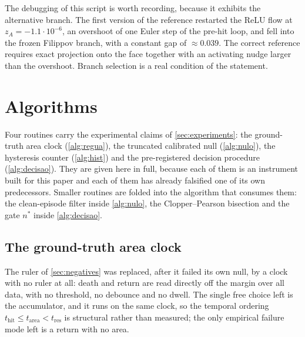 \documentclass[11pt]{article}
\theoremstyle{definition}
\theoremstyle{remark}
\newcommand{\thit}{t_{\mathrm{hit}}}
\begin{document}
The debugging of this script is worth recording, because it exhibits the
alternative branch. The first version of the reference restarted the ReLU flow at
$z_A=-1.1\cdot10^{-6}$, an overshoot of one Euler step of the pre-hit loop, and
fell into the frozen Filippov branch, with a constant gap of $\approx0.039$. The
correct reference requires exact projection onto the face together with an
activating nudge larger than the overshoot. Branch selection is a real condition
of the statement.

\section{Algorithms}\label{app:algorithms}

Four routines carry the experimental claims of \cref{sec:experiments}: the
ground-truth area clock (\cref{alg:regua}), the truncated calibrated null
(\cref{alg:nulo}), the hysteresis counter (\cref{alg:hist}) and the
pre-registered decision procedure (\cref{alg:decisao}). They are given here in
full, because each of them is an instrument built for this paper and each of them
has already falsified one of its own predecessors. Smaller routines are folded
into the algorithm that consumes them: the clean-episode filter inside
\cref{alg:nulo}, the Clopper--Pearson bisection and the gate $n^\ast$ inside
\cref{alg:decisao}.

\subsection{The ground-truth area clock}\label{app:alg1}

The ruler of \cref{sec:negatives} was replaced, after it failed its own null, by
a clock with no ruler at all: death and return are read directly off the margin
over all data, with no threshold, no debounce and no dwell. The single free
choice left is the accumulator, and it runs on the same clock, so the temporal
ordering $\thit\le t_{\mathrm{area}}<t_{\mathrm{res}}$ is structural rather than
measured; the only empirical failure mode left is a return with no area.
\end{document}
